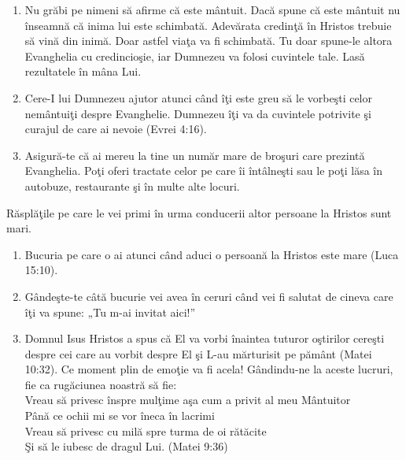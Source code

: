 \begin{enumerate}
	\item Nu grăbi pe nimeni să afirme că este mântuit. Dacă spune că este mântuit nu înseamnă că inima lui este schimbată. Adevărata credinţă în Hristos trebuie să vină din inimă. Doar astfel viaţa va fi schimbată. Tu doar spune-le altora Evanghelia cu credincioşie, iar Dumnezeu va folosi cuvintele tale. Lasă rezultatele în mâna Lui.
	
	\item Cere-I lui Dumnezeu ajutor atunci când îţi este greu să le vorbeşti celor nemântuiţi despre Evanghelie. Dumnezeu îţi va da cuvintele potrivite şi curajul de care ai nevoie (Evrei 4:16).
	
	\item Asigură-te că ai mereu la tine un număr mare de broşuri care prezintă Evanghelia. Poţi oferi tractate celor pe care îi întâlneşti sau le poţi lăsa în autobuze, restaurante şi în multe alte locuri. 
	
	\end{enumerate}

	
Răsplăţile pe care le vei primi în urma conducerii altor persoane la Hristos sunt mari.

	\begin{enumerate}
	
		\item Bucuria pe care o ai atunci când aduci o persoană la Hristos este mare (Luca 15:10).
		\item Gândeşte-te câtă bucurie vei avea în ceruri când vei fi salutat de cineva care îţi va spune: „Tu m-ai invitat aici!”   
		\item Domnul Isus Hristos a spus că El va vorbi înaintea tuturor oştirilor cereşti despre cei care au vorbit despre El şi L-au mărturisit pe pământ (Matei 10:32). Ce moment plin de emoţie va fi acela! Gândindu-ne la aceste lucruri, fie ca rugăciunea noastră să fie:\\
		
	Vreau să privesc înspre mulţime aşa cum a privit al meu Mântuitor\\
	Până ce ochii mi se vor îneca în lacrimi\\	
	Vreau să privesc cu milă spre turma de oi rătăcite\\
	Şi să le iubesc de dragul Lui. (Matei 9:36)\\


\end{enumerate}
